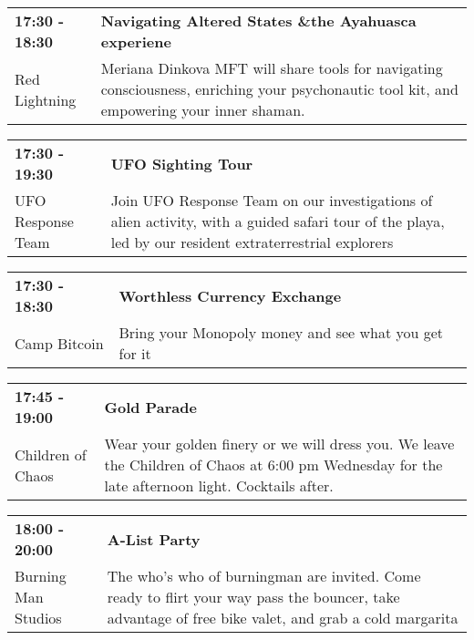 \begin{tabular}{ p{1in} p{2.2in} }
    \textbf{17:30 - 18:30} & \textbf{Navigating Altered States \&the Ayahuasca experiene} \\
    Red Lightning \newline  & Meriana Dinkova MFT will share tools for navigating consciousness, enriching your psychonautic tool kit, and empowering your inner shaman. \\
    \hline 
\end{tabular}
    
\begin{tabular}{ p{1in} p{2.2in} }
    \textbf{17:30 - 19:30} & \textbf{UFO Sighting Tour} \\
    UFO Response Team \newline  & Join UFO Response Team on our investigations of alien activity, with a guided safari tour of the playa, led by our resident extraterrestrial explorers \\
    \hline 
\end{tabular}
    
\begin{tabular}{ p{1in} p{2.2in} }
    \textbf{17:30 - 18:30} & \textbf{Worthless Currency Exchange} \\
    Camp Bitcoin \newline  & Bring your Monopoly money and see what you get for it \\
    \hline 
\end{tabular}
    
\begin{tabular}{ p{1in} p{2.2in} }
    \textbf{17:45 - 19:00} & \textbf{Gold Parade} \\
    Children of Chaos \newline  & Wear your golden finery or we will dress you.  We leave the Children of Chaos at 6:00 pm Wednesday for the late afternoon light.  Cocktails after. \\
    \hline 
\end{tabular}
    
\begin{tabular}{ p{1in} p{2.2in} }
    \textbf{18:00 - 20:00} & \textbf{A-List Party} \\
    Burning Man Studios \newline  & The who's who of burningman are invited.  Come ready to flirt your way pass the bouncer, take advantage of free bike valet, and grab a cold margarita \\
    \hline 
\end{tabular}
    
